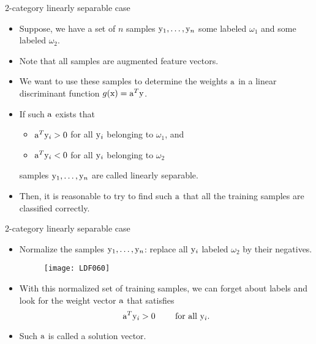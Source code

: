 \begin{frame}{2-category linearly separable case}
\begin{itemize}
\item Suppose, we have a set of $n$ samples ${\rm y}_1,\ldots,{\rm y}_n$
some labeled $\omega_1$ and some labeled $\omega_2$.
\item Note that all samples are augmented feature vectors.
\item We want to use these samples to determine the weights ${\rm a}$ in a linear discriminant function $g({\rm x}) = {\rm a}^T {\rm y}$.
\item If such ${\rm a}$ exists that
\begin{itemize}
\item ${\rm a}^T {\rm y}_i > 0$ for all ${\rm y}_i$ belonging to $\omega_1$, and
\item ${\rm a}^T {\rm y}_i < 0$ for all ${\rm y}_i$ belonging to $\omega_2$
\end{itemize}
samples ${\rm y}_1,\ldots,{\rm y}_n$ are called {\color{mycolor2}linearly separable}.
\item Then, it is reasonable to try to find such ${\rm a}$ that all the
training samples are classified correctly.
\end{itemize}
\end{frame}

\begin{frame}{2-category linearly separable case}
\begin{itemize}
\item {\color{mycolor1}Normalize the samples ${\rm y}_1,\ldots,{\rm y}_n$}: replace all ${\rm y}_i$ labeled $\omega_2$ by their negatives.
\begin{figure}
\texttt{[image: LDF060]}
\end{figure}
\item With this normalized set of training samples, we can
forget about labels and look for the weight vector ${\rm a}$ that
satisfies
\[{\rm a}^T{\rm y}_i > 0~~~~~~\text{       for all } {\rm y}_i.\]
\item Such ${\rm a}$ is called a {\color{mycolor2}solution vector}.
\end{itemize}
\end{frame}

